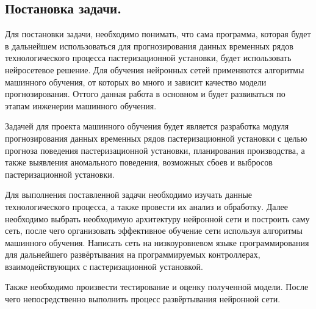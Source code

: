 \titlespace
\subsection{  
  \cyrillicfont 
  \fontsize{14pt}{24pt}\selectfont
  \englishfont
  \redline
  Постановка задачи. 
} 
\titlespace

{\cyrillicfont
\fontsize{13pt}{16.25pt}\selectfont 
\englishfont 

  \par \redline Для постановки задачи, необходимо понимать, что сама программа, которая будет в дальнейшем использоваться для прогнозирования данных временных рядов технологического процесса пастеризационной установки, будет использовать нейросетевое решение. Для обучения нейронных сетей применяются алгоритмы машинного обучения, от которых во много и зависит качество модели прогнозирования. Оттого данная работа в основном и будет развиваться по этапам инженерии машинного обучения. 

  \par \redline Задачей для проекта машинного обучения будет является разработка модуля прогнозирования данных временных рядов пастеризационной установки с целью прогноза поведения пастеризационной установки, планирования производства, а также выявления аномального поведения, возможных сбоев и выбросов пастеризационной установки. 

  \par \redline Для выполнения поставленной задачи необходимо изучать данные технологического процесса, а также провести их анализ и обработку. Далее необходимо выбрать необходимую архитектуру нейронной сети и построить саму сеть, после чего организовать эффективное обучение сети используя алгоритмы машинного обучения.  Написать сеть на низкоуровневом языке программирования для дальнейшего развёртывания на программируемых контроллерах, взаимодействующих с пастеризационной установкой. 

  \par \redline Также необходимо произвести тестирование и оценку полученной модели. После чего непосредственно выполнить процесс развёртывания нейронной сети.  

  \par 
}
